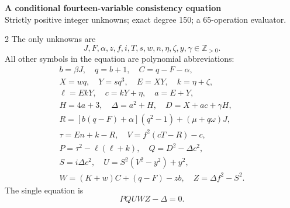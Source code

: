 \documentclass[10pt]{article}
\begin{document}
\begin{center}
{\large\bfseries A conditional fourteen-variable consistency equation}\\[-1pt]
{\small Strictly positive integer unknowns; exact degree 150; a 65-operation evaluator.}
\end{center}\vspace{-8pt}
\begin{multicols}{2}
\fontsize{9}{9.5}\selectfont
The only unknowns are
\[
J,F,\alpha,z,f,i,T,s,w,n,\eta,\zeta,y,\gamma\in\mathbb Z_{>0}.
\]
All other symbols in the equation are polynomial abbreviations:
\[
\begin{gathered}
b=\beta J,\quad q=b+1,\quad C=q-F-\alpha,\\
X=wq,\quad Y=sq^3,\quad E=XY,\quad k=\eta+\zeta,\\
\ell=EkY,\quad c=kY+\eta,\quad a=E+Y,\\
H=4a+3,\quad\Delta=a^2+H,\quad D=X+ac+\gamma H,\\
R=[b(q-F)+\alpha](q^2-1)+(\mu+q\omega)J,\\
\tau=En+k-R,\quad V=f^2(cT-R)-c,\\
P=\tau^2-\ell(\ell+k),\quad Q=D^2-\Delta c^2,\\
S=i\Delta c^2,\quad U=S^2(V^2-y^2)+y^2,\\
W=(K+w)C+(q-F)-zb,\quad Z=\Delta f^2-S^2.
\end{gathered}
\]
The single equation is
\[
\boxed{PQUWZ-\Delta=0.}
\]


\end{multicols}
\end{document}
